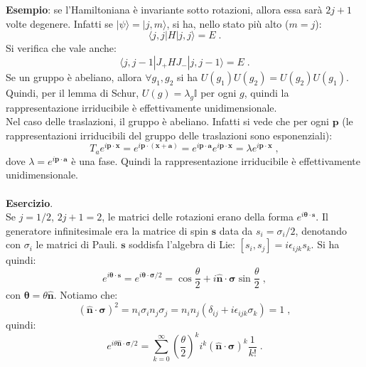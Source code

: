 \documentclass[12pt,a4paper]{report}
\theoremstyle{definition}
\numberwithin{equation}{section}
\newcommand{\bra}{\langle}
\newcommand{\ket}{\rangle}
\begin{document}
\textbf{Esempio}: se l'Hamiltoniana è invariante sotto rotazioni, allora essa sarà $2j+1$ volte degenere. Infatti se $|\psi\ket=|j,m\ket$, si ha, nello stato più alto ($m=j$):
\begin{equation}
\bra j,j|H|j,j\ket=E\;.
\end{equation}
Si verifica che vale anche:
\begin{equation}
\bra j,j-1|J_+HJ_-|j,j-1\ket=E\;.
\end{equation}
Se un gruppo è abeliano, allora $\forall g_1,g_2$ si ha $U(g_1)U(g_2)=U(g_2)U(g_1)$. Quindi, per il lemma di Schur, $U(g)=\lambda_g\mathbb{I}$ per ogni $g$, quindi la rappresentazione irriducibile è effettivamente unidimensionale. \\
Nel caso delle traslazioni, il gruppo è abeliano. Infatti si vede che per ogni $\mathbf{p}$ (le rappresentazioni irriducibili del gruppo delle traslazioni sono esponenziali):
\begin{equation}
T_a e^{i\mathbf{p}\cdot\mathbf{x}}=e^{i\mathbf{p}\cdot(\mathbf{x}+\mathbf{a})}=e^{i\mathbf{p}\cdot\mathbf{a}}e^{i\mathbf{p}
\cdot\mathbf{x}}=\lambda e^{i\mathbf{p}\cdot\mathbf{x}}\;,
\end{equation}
dove $\lambda=e^{i\mathbf{p}\cdot\mathbf{a}}$ è una fase. Quindi la rappresentazione irriducibile è effettivamente unidimensionale. \\
\\
\textbf{Esercizio}. \\
Se $j=1/2$, $2j+1=2$, le matrici delle rotazioni erano della forma $e^{i\boldsymbol{\theta}\cdot\mathbf{s}}$. Il generatore infinitesimale era la matrice di spin $\mathbf{s}$ data da $s_i=\sigma_i/2$, denotando con $\sigma_i$ le matrici di Pauli. $\mathbf{s}$ soddisfa l'algebra di Lie: $[s_i,s_j]=i\epsilon_{ijk}s_k$. Si ha quindi:
\begin{equation}
e^{i\boldsymbol{\theta}\cdot\mathbf{s}}=e^{i\boldsymbol{\theta}\cdot\boldsymbol{\sigma}/2}=\cos\frac{\theta}{2}+i\hat{\mathbf{n}}\cdot\boldsymbol{\sigma}\sin\frac{\theta}{2}\;,
\end{equation}
con $\boldsymbol{\theta}=\theta\hat{\mathbf{n}}$. Notiamo che:
\begin{equation}
(\hat{\mathbf{n}}\cdot\boldsymbol{\sigma})^2=n_i\sigma_in_j\sigma_j=n_in_j(\delta_{ij}+i\epsilon_{ijk}\sigma_k)=1\;,
\end{equation}
quindi:
\begin{equation}
e^{i\theta\hat{\mathbf{n}}\cdot\boldsymbol{\sigma}/2}=\sum_{k=0}^{\infty}\left(\frac{\theta}{2}\right)^k i^k (\hat{\mathbf{n}}\cdot\boldsymbol{\sigma})^k\frac{1}{k!}\;.
\end{equation}
\end{document}
